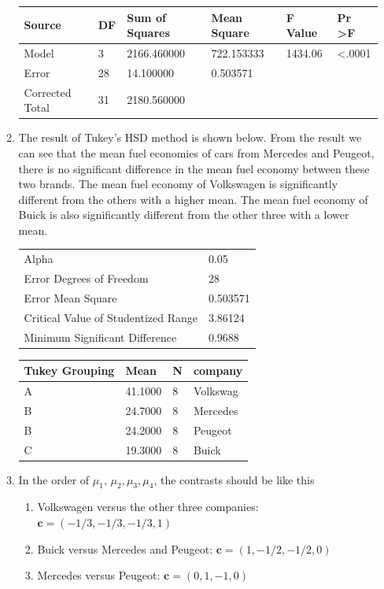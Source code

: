 \documentclass{article}
\begin{document}
\begin{enumerate}[leftmargin = 0 em, label = \arabic*., font = \bfseries]
\begin{enumerate}
\begin{center}
\begin{tabular}{llllll}
\toprule
Source          & DF & Sum of Squares & Mean Square & F Value & Pr \textgreater F \\
\midrule
Model           & 3  & 2166.460000    & 722.153333  & 1434.06 & \textless.0001    \\
Error           & 28 & 14.100000      & 0.503571    &         &                   \\
Corrected Total & 31 & 2180.560000    &             &         & \\
\bottomrule                  
\end{tabular}
\end{center}



	\item The result of Tukey's HSD method is shown below. From the result we can see that the mean fuel economies of cars from Mercedes and Peugeot, there is no significant difference in the mean fuel economy between these two brands. The mean fuel economy of Volkswagen is significantly different from the others with a higher mean. The mean fuel economy of Buick is also significantly different from the other three with a lower mean.
\begin{center}
	\begin{tabular}{ll}
	\toprule
	Alpha&0.05\\
    Error Degrees of Freedom&28\\
    Error Mean Square&0.503571\\
    Critical Value of Studentized Range&3.86124\\
    Minimum Significant Difference&0.9688\\
    \bottomrule
	\end{tabular}

	\begin{tabular}{llll}
	\toprule
	Tukey Grouping&Mean&N&company\\
	\midrule
A&41.1000&8&Volkswag\\
B&24.7000&8&Mercedes\\
B&24.2000&8&Peugeot\\
C&19.3000&8&Buick\\
\bottomrule
	\end{tabular}
	\end{center}


	\item In the order of $\mu_1,\, \mu_2, \mu_3, \mu_4$, the contrasts should be like this
	\begin{enumerate}
		\item Volkswagen versus the other three companies: $\bm c = (-1/3, -1/3, -1/3, 1)$
		\item Buick versus Mercedes and Peugeot: $\bm c = (1, -1/2, -1/2, 0)$
		\item Mercedes versus Peugeot: $\bm c = (0,1,-1,0)$
	\end{enumerate}


\end{enumerate}
\end{enumerate}
\end{document}
